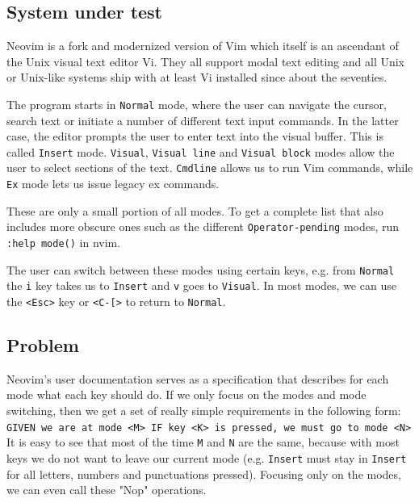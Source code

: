\documentclass[12pt]{article}
\begin{document}
	\subsection{System under test}

		Neovim \cite{nvim} is a fork and modernized version of Vim which itself is an ascendant of the Unix visual text editor Vi. They all support modal text editing and all Unix or Unix-like systems ship with at least Vi installed since about the seventies.

		The program starts in \verb|Normal| mode, where the user can navigate the cursor, search text or initiate a number of different text input commands. In the latter case, the editor prompts the user to enter text into the visual buffer. This is called \verb|Insert| mode. \verb|Visual|, \verb|Visual line| and \verb|Visual block| modes allow the user to select sections of the text. \verb|Cmdline| allows us to run Vim commands, while \verb|Ex| mode lets us issue legacy ex commands.

		These are only a small portion of all modes. To get a complete list that also includes more obscure ones such as the different \verb|Operator-pending| modes, run \verb|:help mode()| in nvim.

		The user can switch between these modes using certain keys, e.g. from \verb|Normal| the \verb|i| key takes us to \verb|Insert| and \verb|v| goes to \verb|Visual|. In most modes, we can use the \verb|<Esc>| key or \verb|<C-[>| to return to \verb|Normal|.

	\subsection{Problem}

		Neovim's user documentation \cite{nvim-user-doc} serves as a specification that describes for each mode what each key should do. If we only focus on the modes and mode switching, then we get a set of really simple requirements in the following form:\\

		\verb|GIVEN we are at mode <M> IF key <K> is pressed, we must go to mode <N>|\\

		It is easy to see that most of the time \verb|M| and \verb|N| are the same, because with most keys we do not want to leave our current mode (e.g. \verb|Insert| must stay in \verb|Insert| for all letters, numbers and punctuations pressed). Focusing only on the modes, we can even call these "Nop" operations.
\end{document}
